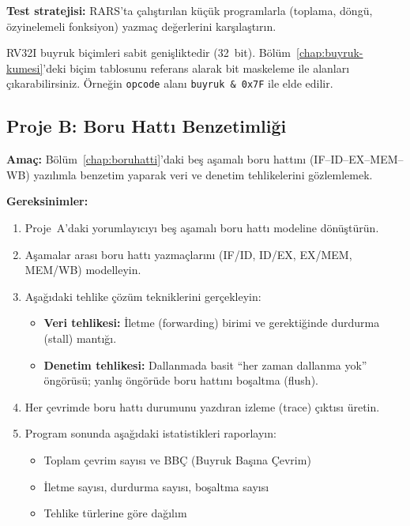 \textbf{Test stratejisi:} RARS'ta çalıştırılan küçük programlarla (toplama, döngü, özyinelemeli fonksiyon) yazmaç değerlerini karşılaştırın.

\begin{bilginot}
RV32I buyruk biçimleri sabit genişliktedir (32~bit). Bölüm~\ref{chap:buyruk-kumesi}'deki biçim tablosunu referans alarak bit maskeleme ile alanları çıkarabilirsiniz. Örneğin \texttt{opcode} alanı \texttt{buyruk \& 0x7F} ile elde edilir.
\end{bilginot}


\subsection{Proje B: Boru Hattı Benzetimliği}
\label{sec:ekd-proje-b}

\textbf{Amaç:} Bölüm~\ref{chap:boruhatti}'daki beş aşamalı boru hattını (IF--ID--EX--MEM--WB) yazılımla benzetim yaparak veri ve denetim tehlikelerini gözlemlemek.\smallskip

\textbf{Gereksinimler:}
\begin{enumerate}[leftmargin=2em]
    \item Proje~A'daki yorumlayıcıyı beş aşamalı boru hattı modeline dönüştürün.
    \item Aşamalar arası boru hattı yazmaçlarını (IF/ID, ID/EX, EX/MEM, MEM/WB) modelleyin.
    \item Aşağıdaki tehlike çözüm tekniklerini gerçekleyin:
    \begin{itemize}[leftmargin=1.5em]
        \item \textbf{Veri tehlikesi:} İletme (forwarding) birimi ve gerektiğinde durdurma (stall) mantığı.
        \item \textbf{Denetim tehlikesi:} Dallanmada basit ``her zaman dallanma yok'' öngörüsü; yanlış öngörüde boru hattını boşaltma (flush).
    \end{itemize}
    \item Her çevrimde boru hattı durumunu yazdıran izleme (trace) çıktısı üretin.
    \item Program sonunda aşağıdaki istatistikleri raporlayın:
    \begin{itemize}[leftmargin=1.5em]
        \item Toplam çevrim sayısı ve BBÇ (Buyruk Başına Çevrim)
        \item İletme sayısı, durdurma sayısı, boşaltma sayısı
        \item Tehlike türlerine göre dağılım
    \end{itemize}
\end{enumerate}

